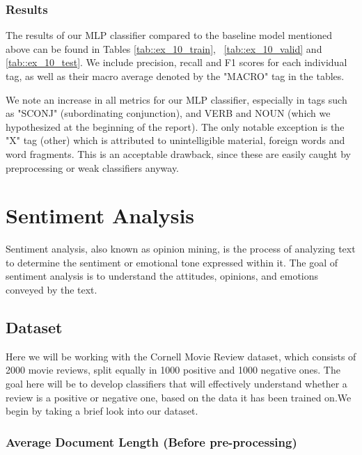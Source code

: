 \documentclass[10pt, a4paper]{article}
\begin{document}
	\subsubsection{Results}
	
	The results of our MLP classifier compared to the baseline model          mentioned above can be found in Tables \ref{tab::ex_10_train}, \    \ref{tab::ex_10_valid} and \ref{tab::ex_10_test}. We include precision, recall and F1 scores for each individual tag, as well as their macro average denoted by the "MACRO" tag in the tables.
	
	We note an increase in all metrics for our MLP classifier, especially in tags such as "SCONJ" (subordinating conjunction), and VERB and NOUN (which we hypothesized at the beginning of the report). The only notable exception is the "X" tag (other) which is attributed to unintelligible material, foreign words and word fragments. This is an acceptable drawback, since these are easily caught by preprocessing or weak classifiers anyway.

	
	
	
	
	



        \section{ Sentiment Analysis}
        
    Sentiment analysis, also known as opinion mining, is the process of analyzing text to determine the sentiment or emotional tone expressed within it. The goal of sentiment analysis is to understand the attitudes, opinions, and emotions conveyed by the text. 

    \subsection{Dataset}
    Here we will be working with the Cornell Movie Review dataset, which consists of 2000 movie reviews, split equally in 1000 positive and 1000 negative ones. The goal here will be to develop classifiers that will effectively understand whether a review is a positive or negative one, based on the data it has been trained on.We begin by taking a brief look into our dataset.
    \subsubsection{Average Document Length (Before pre-processing)}
\end{document}
